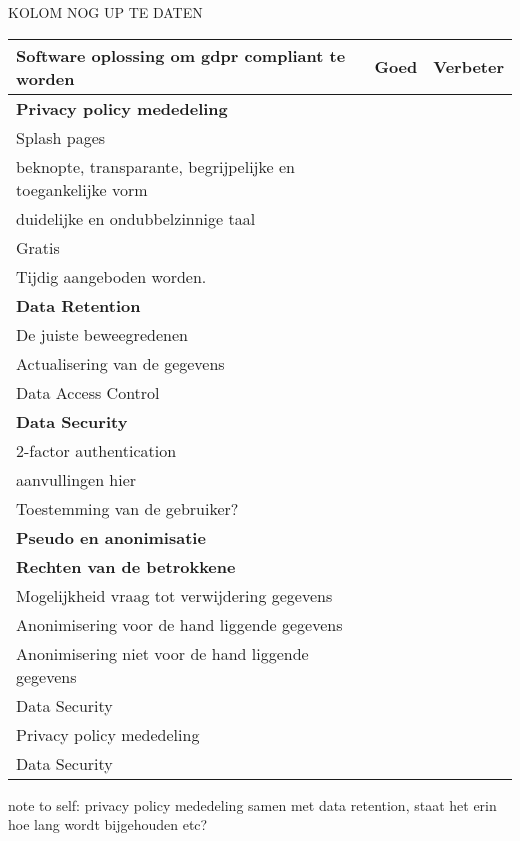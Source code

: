 KOLOM NOG UP TE DATEN 

	\begin{tabularx}{\linewidth}{ |X|l|l| } 
		\hline
		Software oplossing om gdpr compliant te worden & Goed & Verbeter  \\ [0.5ex]
		
		\hline\hline
		\textbf{Privacy policy mededeling} & \checkmark &  \\ 
		Splash pages  &  &  \\ 
		beknopte, transparante, begrijpelijke en toegankelijke vorm  &  &  \\ 
		duidelijke en ondubbelzinnige taal  &  &  \\ 
		Gratis  & \checkmark &  \\ 
		Tijdig aangeboden worden.  &  &  \\ 
		\textbf{Data Retention} &  & \checkmark \\ 
		De juiste beweegredenen &  &  \\
		Actualisering van de gegevens  &  &  \\
		\hline
		Data Access Control &  & \checkmark \\ 
		\hline
		\textbf{Data Security} &  &  \\
		2-factor authentication  & \checkmark &  \\ 
		aanvullingen hier & \checkmark &  \\ 
		\hline
		Toestemming van de gebruiker?  & \checkmark &  \\ 
		\hline
		\textbf{Pseudo en anonimisatie} &  &  \\ 
		\hline
		\textbf{Rechten van de betrokkene} &  &  \\ 
		Mogelijkheid vraag tot verwijdering gegevens & \checkmark &  \\ 
		Anonimisering voor de hand liggende gegevens & \checkmark &  \\
		Anonimisering niet voor de hand liggende gegevens & & \checkmark  \\
		Data Security &  &  \\ 
		
		Privacy policy mededeling & \checkmark &  \\ 
		
		Data Security &  &  \\ 
		\hline
		
	\end{tabularx}

note to self: privacy policy mededeling samen met data retention, staat het erin hoe lang wordt bijgehouden etc? 


